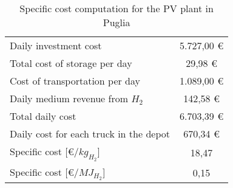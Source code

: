 \begin{table}
\centering
\begin{tabular}{|l|c|}
\hline
\rowcolor{bluepoli!40} \multicolumn{2}{|c|}{\textbf{Specific cost computation - Puglia}}             \\ \hline
\multicolumn{1}{|l|}{Daily investment cost}                  & 5.727,00 €                            \\ \hline
\multicolumn{1}{|l|}{Total cost of storage per day}          & 29,98 €                               \\ \hline
\multicolumn{1}{|l|}{Cost of transportation per day}         & 1.089,00 €                            \\ \hline
\multicolumn{1}{|l|}{Daily medium revenue from $H_2$}        & 142,58 €                              \\ \hline
\multicolumn{1}{|l|}{Total daily cost}                       & 6.703,39 €                            \\ \hline
\multicolumn{1}{|l|}{Daily cost for each truck in the depot} & 670,34 €                              \\ \hline
\multicolumn{1}{|l|}{Specific cost [€/$kg_{H_2}$]}           & 18,47                                 \\ \hline
\multicolumn{1}{|l|}{Specific cost [€/$MJ_{H_2}$]}           & 0,15                                  \\ \hline
\end{tabular}
\caption{Specific cost computation for the PV plant in Puglia}
\label{tab:specificcostpuglia}
\end{table}